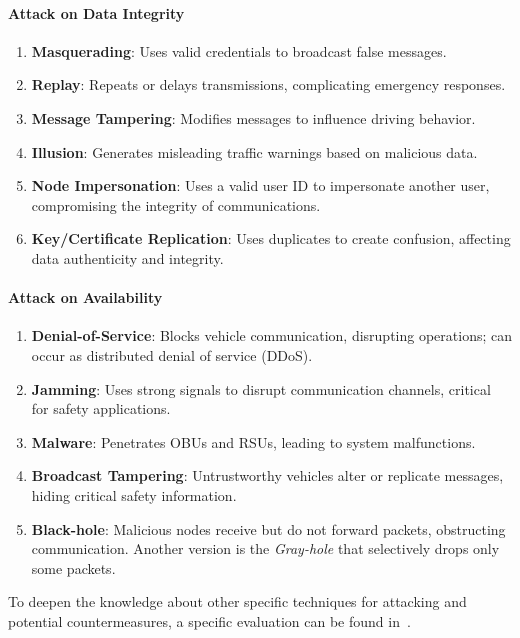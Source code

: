 \paragraph{Attack on Data Integrity}
\begin{enumerate}
    \item \textbf{Masquerading}: Uses valid credentials to broadcast false messages.
    \item \textbf{Replay}: Repeats or delays transmissions, complicating emergency responses.
    \item \textbf{Message Tampering}: Modifies messages to influence driving behavior.
    \item \textbf{Illusion}: Generates misleading traffic warnings based on malicious data.
    \item \textbf{Node Impersonation}: Uses a valid user ID to impersonate another user, compromising the integrity of communications.
    \item \textbf{Key/Certificate Replication}: Uses duplicates to create confusion, affecting data authenticity and integrity.
\end{enumerate}

\paragraph{Attack on Availability}
\begin{enumerate}
    \item \textbf{Denial-of-Service}: Blocks vehicle communication, disrupting operations; can occur as distributed denial of service (DDoS)\cite{sontakke2022impact}.
    \item \textbf{Jamming}: Uses strong signals to disrupt communication channels, critical for safety applications.
    \item \textbf{Malware}: Penetrates OBUs and RSUs, leading to system malfunctions.
    \item \textbf{Broadcast Tampering}: Untrustworthy vehicles alter or replicate messages, hiding critical safety information.
    \item \textbf{Black-hole}: Malicious nodes receive but do not forward packets, obstructing communication. Another version is the \textit{Gray-hole} that selectively drops only some packets.
\end{enumerate}


To deepen the knowledge about other specific techniques for attacking and potential countermeasures, a specific evaluation
can be found in~\cite{simulation-attacks-vanets, sheikh2019comprehensive, macena2023cybersecurity}.

